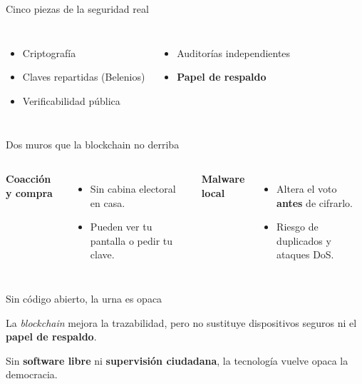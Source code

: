 \documentclass[aspectratio=169,12pt]{beamer}
\def\navprev{}
\def\navnext{}
\newcommand{\nav}[2]{\gdef\navprev{#1}\gdef\navnext{#2}}
\begin{document}
\nav{Blockchain}{Límites}
\begin{frame}{Cinco piezas de la seguridad real}
  \vspace{0.3cm}
  \begin{columns}[T]
      \begin{itemize}
        \item Criptografía
        \item Claves repartidas (Belenios)
        \item Verificabilidad pública
      \end{itemize}
      \begin{itemize}
        \item Auditorías independientes
        \item \alert{\textbf{Papel de respaldo}}
      \end{itemize}
  \end{columns}
\end{frame}

\nav{Seguridad real}{Conclusión}
\begin{frame}{Dos muros que la blockchain no derriba}
  \vspace{0.3cm}
  \begin{columns}[T]
      {\color{terra}\Large\bfseries Coacción y compra}\\[0.25cm]
      \begin{itemize}
        \item Sin cabina electoral en casa.
        \item Pueden ver tu pantalla o pedir tu clave.
      \end{itemize}
      {\color{terra}\Large\bfseries Malware local}\\[0.25cm]
      \begin{itemize}
        \item Altera el voto \alert{\textbf{antes}} de cifrarlo.
        \item Riesgo de duplicados y ataques DoS.
      \end{itemize}
  \end{columns}
\end{frame}

\nav{Límites}{}
\begin{frame}{Sin código abierto, la urna es opaca}
  \vspace{0.3cm}
  {\Large La \textit{blockchain} mejora la trazabilidad, pero no sustituye dispositivos seguros ni el \textbf{papel de respaldo}.\par}
  \vspace{0.8cm}
  {\Large Sin \alert{\textbf{software libre}} ni \alert{\textbf{supervisión ciudadana}}, la tecnología vuelve opaca la democracia.\par}
\end{frame}
\end{document}
